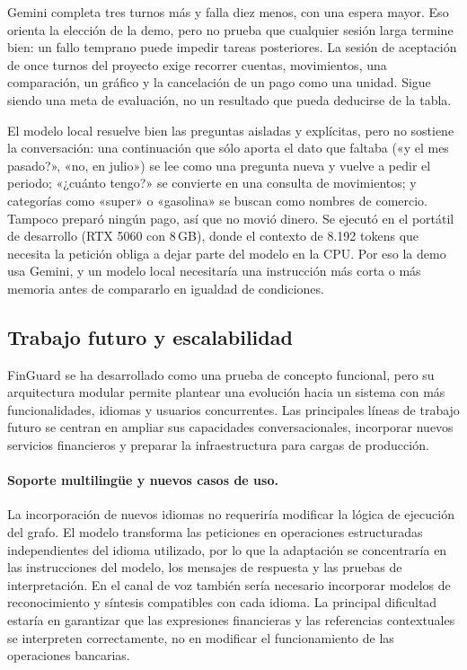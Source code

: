 \documentclass[12pt,a4paper]{article}
\begin{document}
Gemini completa tres turnos más y falla diez menos, con una espera mayor. Eso orienta la elección de la demo, pero no prueba que cualquier sesión larga termine bien: un fallo temprano puede impedir tareas posteriores. La sesión de aceptación de once turnos del proyecto exige recorrer cuentas, movimientos, una comparación, un gráfico y la cancelación de un pago como una unidad. Sigue siendo una meta de evaluación, no un resultado que pueda deducirse de la tabla.

El modelo local resuelve bien las preguntas aisladas y explícitas, pero no sostiene la conversación: una continuación que sólo aporta el dato que faltaba («y el mes pasado?», «no, en julio») se lee como una pregunta nueva y vuelve a pedir el periodo; «¿cuánto tengo?» se convierte en una consulta de movimientos; y categorías como «super» o «gasolina» se buscan como nombres de comercio. Tampoco preparó ningún pago, así que no movió dinero. Se ejecutó en el portátil de desarrollo (RTX 5060 con 8\,GB), donde el contexto de 8.192 tokens que necesita la petición obliga a dejar parte del modelo en la CPU. Por eso la demo usa Gemini, y un modelo local necesitaría una instrucción más corta o más memoria antes de compararlo en igualdad de condiciones.

\subsection{Trabajo futuro y escalabilidad}

FinGuard se ha desarrollado como una prueba de concepto funcional, pero su arquitectura modular permite plantear una evolución hacia un sistema con más funcionalidades, idiomas y usuarios concurrentes. Las principales líneas de trabajo futuro se centran en ampliar sus capacidades conversacionales, incorporar nuevos servicios financieros y preparar la infraestructura para cargas de producción.

\paragraph{Soporte multilingüe y nuevos casos de uso.}

La incorporación de nuevos idiomas no requeriría modificar la lógica de ejecución del grafo. El modelo transforma las peticiones en operaciones estructuradas independientes del idioma utilizado, por lo que la adaptación se concentraría en las instrucciones del modelo, los mensajes de respuesta y las pruebas de interpretación. En el canal de voz también sería necesario incorporar modelos de reconocimiento y síntesis compatibles con cada idioma. La principal dificultad estaría en garantizar que las expresiones financieras y las referencias contextuales se interpreten correctamente, no en modificar el funcionamiento de las operaciones bancarias.
\end{document}
